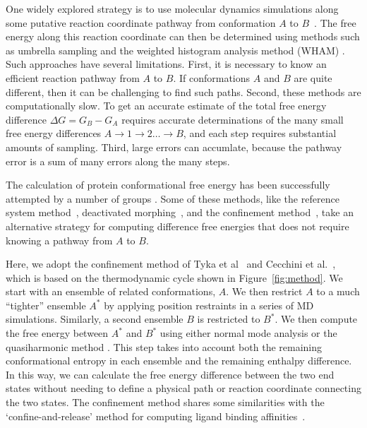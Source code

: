 \documentclass[12pt]{article}
\begin{document}
One widely explored strategy is to use molecular dynamics simulations along some putative reaction coordinate pathway
from conformation $A$ to
$B$~\cite{Elber2007,West2007,Haas2007,Jonsson1998,E2007,Dellago2002,Cheng2006,Elber2005,Chipot2007}. The free energy
along this reaction coordinate can then be determined using methods such as umbrella sampling
\cite{Torrie1977,Mascarenhas2013} and the weighted histogram analysis method (WHAM) \cite{Kumar1992}. Such approaches
have several limitations. First, it is necessary to know an efficient reaction pathway from $A$ to $B$. If conformations
$A$ and $B$ are quite different, then it can be challenging to find such paths. Second, these methods are
computationally slow. To get an accurate estimate of the total free energy difference $\Delta G = G_B - G_A$ requires
accurate determinations of the many small free energy differences $A \rightarrow 1 \rightarrow 2 \ldots \rightarrow B$,
and each step requires substantial amounts of sampling.  Third, large errors can accumlate, because the pathway error is
a sum of many errors along the many steps.

The calculation of protein conformational free energy has been successfully attempted by a number of groups
\cite{Ytreber2006a,Shell2010,Ytreberg2006,Zheng2008,Spichty2010,Strajbl2000,Park2008,Tyka2006,Cecchini2009,Ovchinnikov2013}.
Some of these methods, like the reference system method~\cite{Ytreberg2006}, deactivated morphing~\cite{Park2008}, and
the confinement method~\cite{Tyka2006,Cecchini2009,Ovchinnikov2013}, take an alternative strategy for computing
difference free energies that does not require knowing a pathway from $A$ to $B$.

Here, we adopt the confinement method of Tyka et al~\cite{Tyka2006} and Cecchini et al.~\cite{Cecchini2009}, which is
based on the thermodynamic cycle shown in Figure~\ref{fig:method}. We start with an ensemble of related conformations,
$A$. We then restrict $A$ to a much ``tighter'' ensemble $A^\ast$ by applying position restraints in a series of MD
simulations. Similarly, a second ensemble $B$ is restricted to $B^\ast$. We then compute the free energy between
$A^\ast$ and $B^\ast$ using either normal mode analysis \cite{Brooks1983,Case1994} or the quasiharmonic method
\cite{Karplus1981,Levy1984}. This step takes into account both the remaining conformational entropy in each ensemble and
the remaining enthalpy difference. In this way, we can calculate the free energy difference between the two end states
without needing to define a physical path or reaction coordinate connecting the two states. The confinement method
shares some similarities with the `confine-and-release' method for computing ligand binding
affinities~\cite{Mobley2007,Mobley2012,Mobley2006}.
\end{document}

